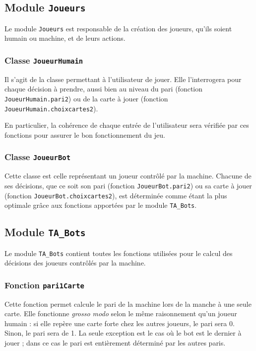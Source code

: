    \subsection{Module \texttt{Joueurs}}\label{subsec:module-joueurs}
      Le module \texttt{Joueurs} est responsable de la création des joueurs, qu'ils soient humain ou machine, et de leurs actions.

      \subsubsection{Classe \texttt{JoueurHumain}}
         Il s'agit de la classe permettant à l'utilisateur de jouer.
         Elle l'interrogera pour chaque décision à prendre, aussi bien au niveau du pari (fonction \texttt{JoueurHumain.pari2}) ou de la carte à jouer (fonction \texttt{JoueurHumain.choixcartes2}).

         En particulier, la cohérence de chaque entrée de l'utilisateur sera vérifiée par ces fonctions pour assurer le bon fonctionnement du jeu.

      \subsubsection{Classe \texttt{JoueurBot}}
         Cette classe est celle représentant un joueur contrôlé par la machine.
         Chacune de ses décisions, que ce soit son pari (fonction \texttt{JoueurBot.pari2}) ou sa carte à jouer (fonction \texttt{JoueurBot.choixcartes2}), est déterminée comme étant la plus optimale grâce aux fonctions apportées par le module \texttt{TA\_Bots}.
   
   \subsection{Module \texttt{TA\_Bots}}\label{subsec:module-ta-bots}
      Le module \texttt{TA\_Bots} contient toutes les fonctions utilisées pour le calcul des décisions des joueurs contrôlés par la machine.
      \subsubsection{Fonction \texttt{pari1Carte}}
         Cette fonction permet calcule le pari de la machine lors de la manche à une seule carte.
         Elle fonctionne \textit{grosso modo} selon le même raisonnement qu'un joueur humain : si elle repère une carte forte chez les autres joueurs, le pari sera 0.
         Sinon, le pari sera de 1.
         La seule exception est le cas où le bot est le dernier à jouer ;
         dans ce cas le pari est entièrement déterminé par les autres paris.

